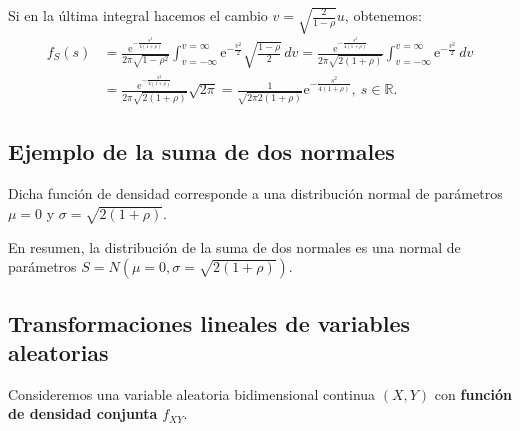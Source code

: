 \documentclass[]{book}
\begin{document}
Si en la última integral hacemos el cambio \(v=\sqrt{\frac{2}{1-\rho}}u\), obtenemos:
\[
\begin{array}{rl}
f_S(s)  & = \frac{\mathrm{e}^{-\frac{s^2}{4(1+\rho)}}}{2\pi\sqrt{1-\rho^2}}\int_{v=-\infty}^{v=\infty}\mathrm{e}^{-\frac{v^2}{2}} \sqrt{\frac{1-\rho}{2}}\, dv= \frac{\mathrm{e}^{-\frac{s^2}{4(1+\rho)}}}{2\pi\sqrt{2(1+\rho)}}\int_{v=-\infty}^{v=\infty}\mathrm{e}^{-\frac{v^2}{2}} \, dv \\ & = \frac{\mathrm{e}^{-\frac{s^2}{4(1+\rho)}}}{2\pi\sqrt{2(1+\rho)}} \sqrt{2\pi}= \frac{1}{\sqrt{2\pi 2(1+\rho)}}\mathrm{e}^{-\frac{s^2}{4(1+\rho)}},\ s\in\mathbb{R}.
\end{array}
\]

\hypertarget{ejemplo-de-la-suma-de-dos-normales-3}{%
\subsection{Ejemplo de la suma de dos normales}\label{ejemplo-de-la-suma-de-dos-normales-3}}

Dicha función de densidad corresponde a una distribución normal de parámetros \(\mu =0\) y \(\sigma = \sqrt{2(1+\rho)}\).

En resumen, la distribución de la suma de dos normales es una normal de parámetros \(S=N(\mu=0,\sigma = \sqrt{2(1+\rho)})\).

\hypertarget{transformaciones-lineales-de-variables-aleatorias}{%
\subsection{Transformaciones lineales de variables aleatorias}\label{transformaciones-lineales-de-variables-aleatorias}}

Consideremos una variable aleatoria bidimensional continua \((X,Y)\) con \textbf{función de densidad conjunta} \(f_{XY}\).
\end{document}
